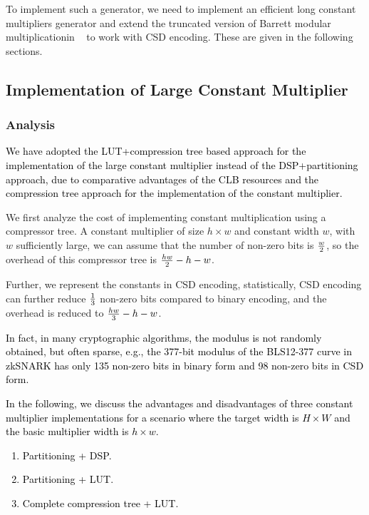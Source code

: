 \documentclass[conference]{IEEEtran}
\begin{document}
To implement such a generator, we need to implement an efficient long constant multipliers generator and extend the truncated version of Barrett modular multiplicationin ~\cite{Efficient_FPGA_Modular_Multiplication_Implementation} to work with CSD encoding. These are given in the following sections.

\subsection{Implementation of Large Constant Multiplier}

\subsubsection{Analysis}

\textcolor{black}{
We have adopted the LUT+compression tree based approach for the implementation of the large constant multiplier instead of the DSP+partitioning approach, due to comparative advantages of the CLB resources and the compression tree approach for the implementation of the constant multiplier.
}

We first analyze the cost of implementing constant multiplication using a compressor tree. A constant multiplier of size $h\times w$ and constant width $w$, with $w$ sufficiently large, we can assume that the number of non-zero bits is $w\over 2$, so the overhead of this compressor tree is ${{hw} \over 2} - h - w$.

Further, we represent the constants in CSD encoding, statistically, CSD encoding can further reduce $1\over 3$ non-zero bits compared to binary encoding, and the overhead is reduced to ${{hw} \over 3} - h - w$.

\textcolor{black}{
In fact, in many cryptographic algorithms, the modulus is not randomly obtained,  but often sparse, e.g., the 377-bit modulus of the BLS12-377 curve in zkSNARK has only 135 non-zero bits in binary form and 98 non-zero bits in CSD form.
}

\textcolor{black}{
In the following, we discuss the advantages and disadvantages of  three constant multiplier implementations for a scenario where the target width is $H \times W$ and the basic multiplier width is $h \times w$.
\begin{enumerate}[(1)]
    \item Partitioning + DSP.
    \item Partitioning + LUT.
    \item Complete compression tree + LUT.
\end{enumerate}
}
\end{document}
